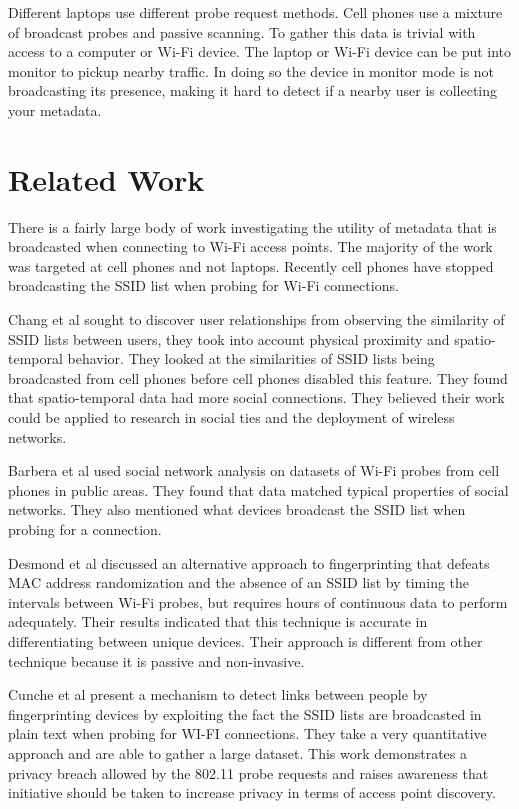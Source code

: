 \documentclass[letterpaper,twocolumn,10pt]{article}
\begin{document}
Different laptops use different probe request methods. Cell phones use a mixture of broadcast probes and passive scanning. To gather this data is trivial with access to a computer or Wi-Fi device. The laptop or Wi-Fi device can be put into monitor to pickup nearby traffic. In doing so the device in monitor mode is not broadcasting its presence, making it hard to detect if a nearby user is collecting your metadata.

\section{Related Work}
There is a fairly large body of work investigating the utility of metadata that is broadcasted when connecting to Wi-Fi access points. The majority of the work was targeted at cell phones and not laptops. Recently cell phones have stopped broadcasting the SSID list when probing for Wi-Fi connections.

Chang et al  sought to discover user relationships from observing the similarity of SSID lists between users, they took into account physical proximity and spatio-temporal behavior. They looked at the similarities of SSID lists being broadcasted from cell phones before cell phones disabled this feature. They found that spatio-temporal data had more social connections. They believed their work could be applied to research in social ties and the deployment of wireless networks.

Barbera et al  used social network analysis on datasets of Wi-Fi probes from cell phones in public areas. They found that data matched typical properties of social networks. They also mentioned what devices broadcast the SSID list when probing for a connection.

Desmond et al discussed an alternative approach to fingerprinting that defeats MAC address 
randomization and the absence of an SSID list by timing the intervals between Wi-Fi probes, but requires hours of continuous data to perform adequately. Their results indicated that this technique is accurate in differentiating between unique devices. Their approach is different from other technique because it is passive and non-invasive.

Cunche et al  present a mechanism to detect links between people by fingerprinting devices by exploiting the fact the SSID lists are broadcasted in plain text when probing for WI-FI connections. They take a very quantitative approach and are able to gather a large dataset. This work demonstrates a privacy breach allowed by the 802.11 probe requests and raises awareness that initiative should be taken to increase privacy in terms of access point discovery. 
\end{document}
